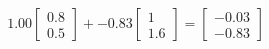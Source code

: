 \documentclass[preview]{standalone}
\begin{document}
\begin{align*}
1.00 \begin{bmatrix} 0.8 \\ 0.5 \end{bmatrix} + -0.83 \begin{bmatrix} 1 \\ 1.6 \end{bmatrix} = \begin{bmatrix} -0.03 \\ -0.83 \end{bmatrix}
\end{align*}
\end{document}
